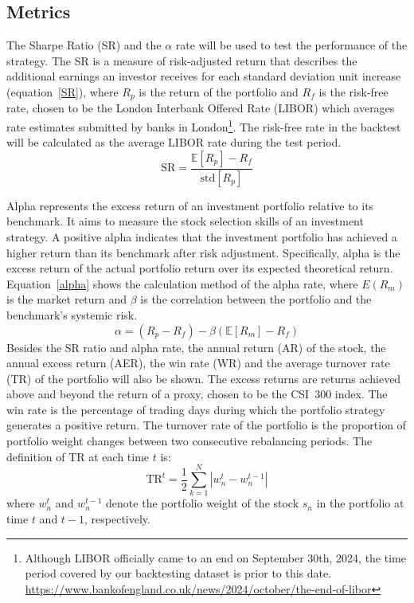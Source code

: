 \documentclass[preprint,12pt]{elsarticle}
\begin{document}
\subsection{Metrics}
The Sharpe Ratio (SR) \citep{Sharpe} and the $\alpha$ rate will be used to test the performance of the strategy. The SR is a measure of risk-adjusted return that describes the additional earnings an investor receives for each standard deviation unit increase (equation~\eqref{SR}), where $R_p$ is the return of the portfolio and $R_f$ is the risk-free rate, chosen to be the London Interbank Offered Rate (LIBOR) which averages rate estimates submitted by banks in London\footnote{Although LIBOR officially came to an end on September 30th, 2024, the time period covered by our backtesting dataset is prior to this date. \url{https://www.bankofengland.co.uk/news/2024/october/the-end-of-libor}}.
The risk-free rate in the backtest will be calculated as the average LIBOR rate during the test period.
\begin{equation}
\mathrm{SR} = \frac{\mathbb{E}[R_p]-R_f}{\mathrm{std}[R_p]}
\label{SR}
\end{equation}
        
Alpha represents the excess return of an investment portfolio relative to its benchmark. It aims to measure the stock selection skills of an investment strategy. A positive alpha indicates that the investment portfolio has achieved a higher return than its benchmark after risk adjustment. Specifically, alpha is the excess return of the actual portfolio return over its expected theoretical return. Equation~\eqref{alpha} shows the calculation method of the alpha rate, where $E(R_m)$ is the market return and $\beta$ is the correlation between the portfolio and the benchmark's systemic risk.
\begin{equation}
\alpha = (R_p - R_f)-\beta(\mathbb{E}[R_m]-R_f)
\label{alpha}
\end{equation}
Besides the SR ratio and alpha rate, the annual return (AR) of the stock, the annual excess return (AER), the win rate (WR) and the average turnover rate (TR) of the portfolio will also be shown. The excess returns are returns achieved above and beyond the return of a proxy, chosen to be the CSI~300 index. The win rate is the percentage of trading days during which the portfolio strategy generates a positive return. The turnover rate of the portfolio is the proportion of portfolio weight changes between two consecutive rebalancing periods. The definition of TR at each time $t$ is:
\begin{equation}
\mathrm{TR}^t = \frac{1}{2}\sum^N_{k=1} |w^t_n - w^{t-1}_n |
\label{turnoverp}
\end{equation}
where $w^t_n$ and $w^{t-1}_n$ denote the portfolio weight of the stock $s_n$ in the portfolio at time $t$ and $t-1$, respectively.
\end{document}
